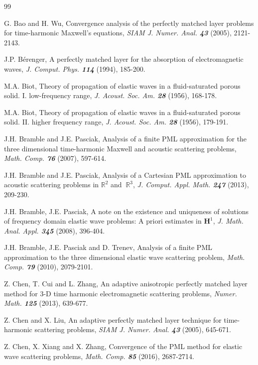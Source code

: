 \documentclass[11pt]{article}
\newcommand{\mat}{\mathbb}
\newcommand{\R}{{\mat R}}
\newcommand{\bs}{\boldsymbol}
\begin{document}
\begin{thebibliography}{99}

 G. Bao and H. Wu, Convergence analysis of the perfectly matched layer problems 
for time-harmonic Maxwell's equations, {\em SIAM J. Numer. Anal. \bf 43} (2005), 2121-2143.

 J.P. B\'erenger, A perfectly matched layer for the absorption of 
electromagnetic waves,  {\em J. Comput. Phys. \bf 114} (1994), 185-200.

 M.A. Biot, Theory of propagation of elastic waves in a fluid-saturated porous 
solid. I. low-frequency range, {\em J. Acoust. Soc. Am. \bf 28} (1956), 168-178.

 M.A. Biot, Theory of propagation of elastic waves in a fluid-saturated 
porous solid. II. higher frequency range, {\em J. Acoust. Soc. Am. \bf 28} (1956), 179-191.

 J.H. Bramble and J.E. Pasciak, Analysis of a finite PML approximation 
for the three dimensional time-harmonic Maxwell and acoustic scattering problems, {\em Math. 
Comp. \bf 76} (2007), 597-614.

 J.H. Bramble and J.E. Pasciak, Analysis of a Cartesian PML approximation to
acoustic scattering problems in $\R^2$ and $\ \R^3$, {\em J. Comput. Appl. Math. \bf 247} (2013), 209-230.

 J.H. Bramble, J.E. Pasciak, A note on the existence and uniqueness of solutions 
of frequency domain elastic wave problems: A priori estimates in $\bs{H}^1$, {\em J. Math. Anal. 
Appl. \bf 345} (2008), 396-404.

 J.H. Bramble, J.E. Pasciak and D. Trenev, Analysis of a finite PML approximation
 to the three dimensional elastic wave scattering problem, {\em Math. Comp. \bf 79} (2010), 2079-2101.

 Z. Chen, T. Cui and L. Zhang, An adaptive anisotropic perfectly matched layer
 method for 3-D time harmonic electromagnetic scattering problems, {\em Numer. Math. \bf 125} (2013), 639-677.

 Z. Chen and X. Liu, An adaptive perfectly matched layer technique for time-harmonic
scattering problems, {\em SIAM J. Numer. Anal. \bf43} (2005), 645-671.

 Z. Chen, X. Xiang and X. Zhang, Convergence of the PML method for elastic wave
 scattering problems, {\em Math. Comp. \bf 85} (2016), 2687-2714.


\end{thebibliography}
\end{document}
